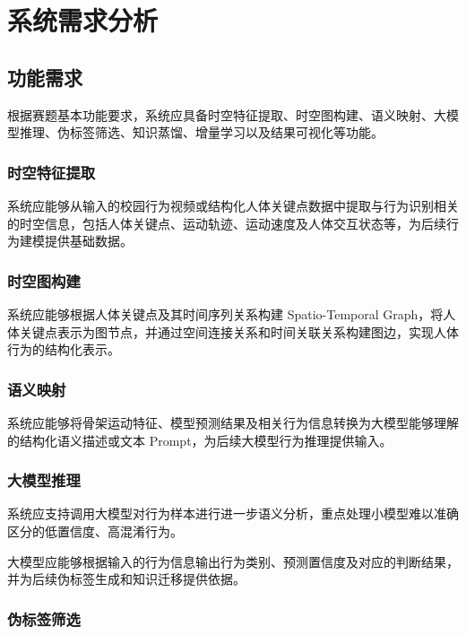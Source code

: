 \chapter{系统需求分析}

\section{功能需求}

根据赛题基本功能要求，系统应具备时空特征提取、时空图构建、语义映射、大模型推理、伪标签筛选、知识蒸馏、增量学习以及结果可视化等功能。

\subsection{时空特征提取}

系统应能够从输入的校园行为视频或结构化人体关键点数据中提取与行为识别相关的时空信息，包括人体关键点、运动轨迹、运动速度及人体交互状态等，为后续行为建模提供基础数据。

\subsection{时空图构建}

系统应能够根据人体关键点及其时间序列关系构建 Spatio-Temporal Graph，将人体关键点表示为图节点，并通过空间连接关系和时间关联关系构建图边，实现人体行为的结构化表示。

\subsection{语义映射}

系统应能够将骨架运动特征、模型预测结果及相关行为信息转换为大模型能够理解的结构化语义描述或文本 Prompt，为后续大模型行为推理提供输入。

\subsection{大模型推理}

系统应支持调用大模型对行为样本进行进一步语义分析，重点处理小模型难以准确区分的低置信度、高混淆行为。

大模型应能够根据输入的行为信息输出行为类别、预测置信度及对应的判断结果，并为后续伪标签生成和知识迁移提供依据。

\subsection{伪标签筛选}

